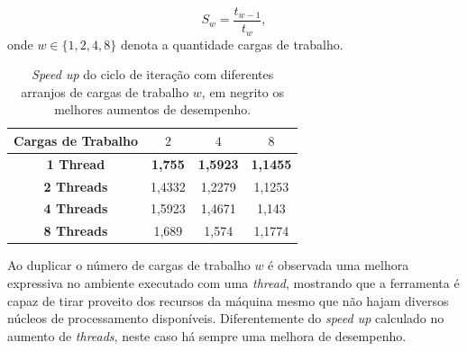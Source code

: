 \begin{equation}
	S_w = \frac{t_{w-1}}{t_{w}},
	\label{eq:speedup2}
\end{equation}
onde $w \in \{1,2,4,8\}$ denota a quantidade cargas de trabalho.

\begin{table}[!htbp]
\caption{\textit{Speed up} do ciclo de iteração com diferentes arranjos de cargas de trabalho $w$, em negrito os melhores aumentos de desempenho.}
\centering{}
\begin{tabular}{c|c|c|c}
	\toprule 
	\textbf{Cargas de Trabalho} & $2$ & $4$  & $8$\\ 
	\midrule 
	\textbf{1 Thread} & \textbf{1,755} &	\textbf{1,5923} &	\textbf{1,1455} \\ 
	\midrule 
	\textbf{2 Threads} & 1,4332 &	1,2279 & 1,1253\\ 
	\midrule 
	\textbf{4 Threads} & 1,5923 &	1,4671 &	1,143\\ 
	\midrule 
	\textbf{8 Threads} & 1,689 &	1,574 & 1,1774	\\ 
	\bottomrule 
\end{tabular} 
\label{tab1:speedup2}
\end{table}

Ao duplicar o número de cargas de trabalho $w$ é observada uma melhora expressiva no ambiente executado com uma \textit{thread}, mostrando que a ferramenta é capaz de tirar proveito dos recursos da máquina mesmo que não hajam diversos núcleos de processamento disponíveis. Diferentemente do \textit{speed up} calculado no aumento de \textit{threads}, neste caso há sempre uma melhora de desempenho.